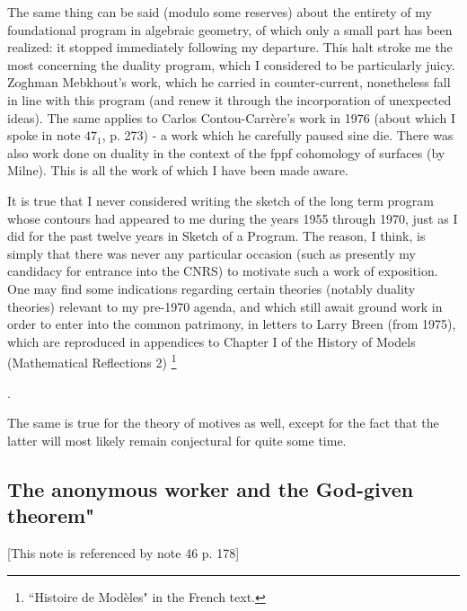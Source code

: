 \label{note:48.1} The same thing can be said (modulo some reserves) about the entirety of my foundational program in algebraic geometry, of which only a small part has been realized: it stopped immediately following my departure. This halt stroke me the most concerning the duality program, which I considered to be particularly juicy. Zoghman Mebkhout's work, which he carried in counter-current, nonetheless fall in line with this program (and renew it through the incorporation of unexpected ideas). The same applies to Carlos Contou-Carr\`ere's work in 1976 (about which I spoke in note $47_1$, p. 273) - a work which he carefully paused sine die. There was also work done on duality in the context of the fppf cohomology of surfaces (by Milne). This is all the work of which I have been made aware.

It is true that I never considered writing the sketch of the long term program whose contours had appeared to me during the years 1955 through 1970, just as I did for the past twelve years in Sketch of a Program. The reason, I think, is simply that there was never any particular occasion (such as presently my candidacy for entrance into the CNRS) to motivate such a work of exposition. One may find some indications regarding certain theories (notably duality theories) relevant to my pre-1970 agenda, and which still await ground work in order to enter into the common patrimony, in letters to Larry Breen (from 1975), which are reproduced in appendices to Chapter I of the History of Models (Mathematical Reflections 2)
\footnote{``Histoire de Mod\`eles" in the French text.}
\addtocounter{footnote}{-1}.

\label{note:48.2} The same is true for the theory of motives as well, except for the fact that the latter will most likely remain conjectural for quite some time.

\subsection{The anonymous worker and the God-given theorem"}

\label{note:48'} [This note is referenced by note 46 p. 178]

